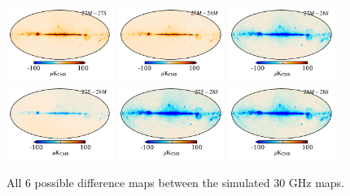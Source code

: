 \documentclass{aa}
\begin{document}
\begin{figure}
\includegraphics[width=0.31\textwidth]{figs/sim_27M_minus_27S.pdf} 
\includegraphics[width=0.31\textwidth]{figs/sim_27M_minus_28M.pdf} 
\includegraphics[width=0.31\textwidth]{figs/sim_27M_minus_28S.pdf}\\
\includegraphics[width=0.31\textwidth]{figs/sim_27S_minus_28M.pdf} 
\includegraphics[width=0.31\textwidth]{figs/sim_27S_minus_28S.pdf}
\includegraphics[width=0.31\textwidth]{figs/sim_28M_minus_28S.pdf}
\caption{All 6 possible difference maps between the simulated 30 GHz maps. } \label{fig:sim_bp_diffs}
\end{figure}
\end{document}
